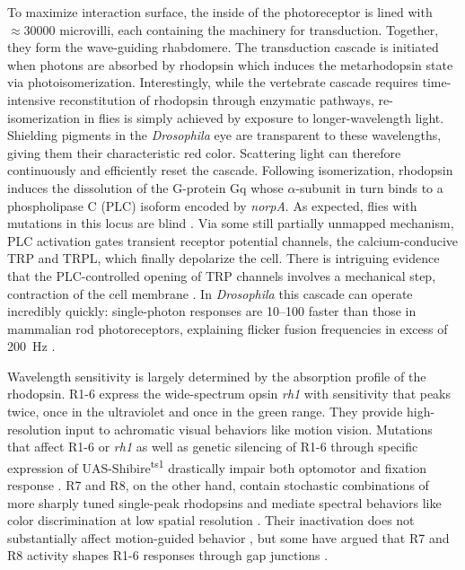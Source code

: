 To maximize interaction surface, the inside of the photoreceptor is lined with $\approx\num{30000}$ microvilli, each containing the machinery for transduction. Together, they form the wave-guiding rhabdomere. The transduction cascade is initiated when photons are absorbed by rhodopsin which induces the metarhodopsin state via photoisomerization. Interestingly, while the vertebrate cascade requires time-intensive reconstitution of rhodopsin through enzymatic pathways, re-isomerization in flies is simply achieved by exposure to longer-wavelength light. Shielding pigments in the \textit{Drosophila} eye are transparent to these wavelengths, giving them their characteristic red color. Scattering light can therefore continuously and efficiently reset the cascade. Following isomerization, rhodopsin induces the dissolution of the G-protein Gq whose $\alpha$-subunit in turn binds to a phospholipase C (PLC) isoform encoded by \textit{norpA}. As expected, flies with mutations in this locus are blind \citep{Bloomquist:1988aa}. Via some still partially unmapped mechanism, PLC activation gates transient receptor potential channels, the calcium-conducive TRP and TRPL, which finally depolarize the cell. There is intriguing evidence that the PLC-controlled opening of TRP channels involves a mechanical step, contraction of the cell membrane \citep{Hardie:2012aa}. In \textit{Drosophila} this cascade can operate incredibly quickly: single-photon responses are \SIrange{10}{100}{\times} faster than those in mammalian rod photoreceptors, explaining flicker fusion frequencies in excess of \SI{200}{\hertz} \citep{Heisenberg:1984aa,Hardie:2015aa}.

Wavelength sensitivity is largely determined by the absorption profile of the rhodopsin. R1-6 express the wide-spectrum opsin \textit{rh1} with sensitivity that peaks twice, once in the ultraviolet and once in the green range. They provide high-resolution input to achromatic visual behaviors like motion vision. Mutations that affect R1-6 or \textit{rh1} as well as genetic silencing of R1-6 through specific expression of UAS-Shibire\textsuperscript{ts1} drastically impair both optomotor and fixation response \citep{Heisenberg:1977aa,OTousa:1985aa,Rister:2007fn}. R7 and R8, on the other hand, contain stochastic combinations of more sharply tuned single-peak rhodopsins \citep{Franceschini:1981aa} and mediate spectral behaviors like color discrimination at low spatial resolution \citep{Schnaitmann:2013aa}. Their inactivation does not substantially affect motion-guided behavior \citep{Yamaguchi:2008aa}, but some have argued that R7 and R8 activity shapes R1-6 responses through gap junctions \citep{Wardill:2012aa}.

